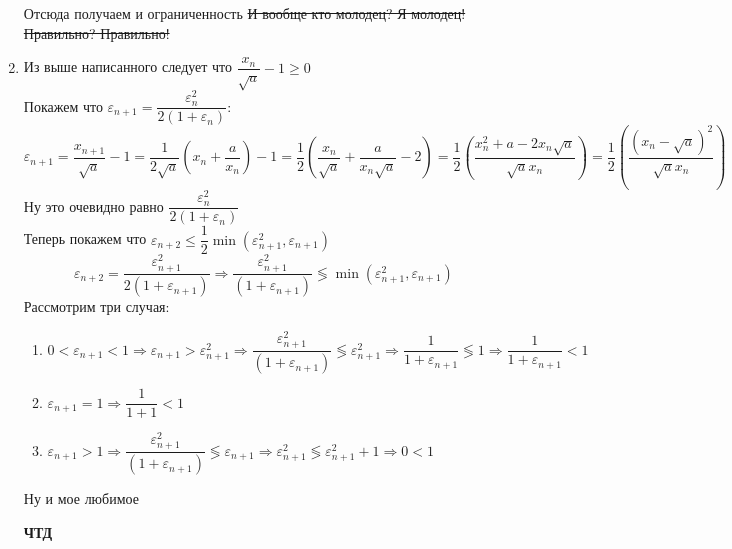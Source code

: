 \documentclass{report}
\begin{document}
\begin{enumerate}
\begin{enumerate}
	\end{enumerate}
	Отсюда получаем и ограниченность \sout{И вообще кто молодец? Я молодец! Правильно? Правильно!}
\item Из выше написанного следует что $\dfrac{x_n}{\sqrt{a}}-1\geq 0$\\
	Покажем что $\varepsilon_{n+1}=\dfrac{\varepsilon_n^2}{2(1+\varepsilon_n)}$:
	\begin{equation*}
		\varepsilon_{n+1}=\dfrac{x_{n+1}}{\sqrt{a}}-1=\frac{1}{2\sqrt{a}}\left(x_{n}+\dfrac{a}{x_{n}}\right)-1=
		\frac{1}{2}\left(\dfrac{x_{n}}{\sqrt{a}}+\dfrac{a}{x_{n}\sqrt{a}}-2\right)=
		\frac{1}{2}\left(\dfrac{x_{n}^2+a-2x_n\sqrt{a}}{\sqrt{a}x_n}\right)=
		\frac{1}{2}\left(\dfrac{(x_n-\sqrt a)^2}{\sqrt{a}x_n}\right)
	\end{equation*}
	Ну это очевидно равно $\dfrac{\varepsilon_n^2}{2(1+\varepsilon_n)}$\\
Теперь покажем что $\varepsilon_{n+2}\leq \dfrac{1}{2}\min{(\varepsilon_{n+1}^2,\varepsilon_{n+1})}$
\begin{equation*}
	\varepsilon_{n+2}=\dfrac{\varepsilon_{n+1}^2}{2(1+\varepsilon_{n+1})}\Rightarrow \dfrac{\varepsilon_{n+1}^2}{(1+\varepsilon_{n+1})} \lessgtr \min{(\varepsilon_{n+1}^2,\varepsilon_{n+1})}
\end{equation*}
Рассмотрим три случая:
\begin{enumerate}
	\item $0< \varepsilon_{n+1} <1 \Rightarrow \varepsilon_{n+1}>\varepsilon_{n+1}^2 \Rightarrow \dfrac{\varepsilon_{n+1}^2}{(1+\varepsilon_{n+1})} \lessgtr \varepsilon_{n+1}^2 \Rightarrow \dfrac{1}{1+\varepsilon_{n+1}}\lessgtr1 \Rightarrow \dfrac{1}{1+\varepsilon_{n+1}}<1$
	\item $\varepsilon_{n+1} =1 \Rightarrow \dfrac{1}{1+1}<1$
	\item $\varepsilon_{n+1} >1 \Rightarrow \dfrac{\varepsilon_{n+1}^2}{(1+\varepsilon_{n+1})}\lessgtr \varepsilon_{n+1} \Rightarrow
		\varepsilon_{n+1}^2\lessgtr \varepsilon_{n+1}^2+1 \Rightarrow 0 <1$
\end{enumerate}
Ну и мое любимое
\begin{center}
	\textbf{ЧТД}
\end{center}
\begin{figure}[H]
	\begin{center}

\end{center}
\end{figure}
\end{enumerate}
\end{document}
